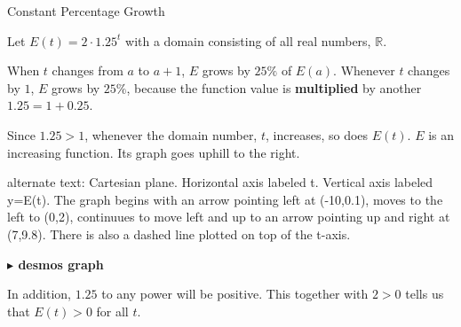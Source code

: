 \documentclass{ximera}
\begin{document}
\begin{example} Constant Percentage Growth

Let $E(t) = 2 \cdot 1.25^t$ with a domain consisting of all real numbers, $\mathbb{R}$. 

When $t$ changes from $a$ to $a+1$, $E$ grows by $25\%$ of $E(a)$.  Whenever $t$ changes by $1$, $E$ grows by $25\%$, because the function value is \textbf{multiplied} by another $1.25 = 1 + 0.25$.


Since $1.25 > 1$, whenever the domain number, $t$, increases, so does $E(t)$.  $E$ is an increasing function.  Its graph goes uphill to the right.









\begin{image}
\end{image}



\textcolor{gray!90}{alternate text: Cartesian plane. Horizontal axis labeled t. Vertical axis labeled y=E(t).  The graph begins with an arrow pointing left at (-10,0.1), moves to the left to (0,2), continuues to move left and up to an arrow pointing up and right at (7,9.8). There is also a dashed line plotted on top of the t-axis.}

\begin{onlineOnly}
\textbf{\textcolor{blue!55!black}{$\blacktriangleright$ desmos graph}} 
\begin{center}
\end{center}
\end{onlineOnly}


In addition, $1.25$ to any power will be positive.  This together with $2>0$ tells us that $E(t) > 0$ for all $t$.


\end{example}
\end{document}
